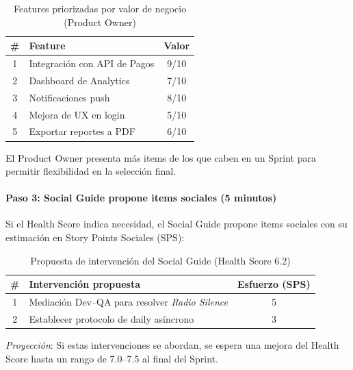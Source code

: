 \begin{table}[h]
    \centering
    \small
    \begin{tabularx}{\textwidth}{|c|X|c|}
        \hline
        \textbf{\#} & \textbf{Feature}             & \textbf{Valor} \\
        \hline
        1           & Integración con API de Pagos & 9/10           \\
        \hline
        2           & Dashboard de Analytics       & 7/10           \\
        \hline
        3           & Notificaciones push          & 8/10           \\
        \hline
        4           & Mejora de UX en login        & 5/10           \\
        \hline
        5           & Exportar reportes a PDF      & 6/10           \\
        \hline
    \end{tabularx}
    \caption{Features priorizadas por valor de negocio (Product Owner)}
    \label{tab:features-priorizadas-valor}
\end{table}
\FloatBarrier

El Product Owner presenta más items de los que caben en un Sprint para permitir flexibilidad en la selección final.

\paragraph{Paso 3: Social Guide propone items sociales (5 minutos)}

Si el Health Score indica necesidad, el Social Guide propone items sociales con su estimación en Story Points Sociales (SPS):

\begin{table}[h]
    \centering
    \small
    \begin{tabularx}{\textwidth}{|c|X|c|}
        \hline
        \textbf{\#} & \textbf{Intervención propuesta}                        & \textbf{Esfuerzo (SPS)} \\
        \hline
        1           & Mediación Dev--QA para resolver \textit{Radio Silence} & 5                       \\
        \hline
        2           & Establecer protocolo de daily asíncrono                & 3                       \\
        \hline
    \end{tabularx}
    \caption{Propuesta de intervención del Social Guide (Health Score 6.2)}
    \label{tab:propuesta-social-guide}
\end{table}
\FloatBarrier
\textit{Proyección}: Si estas intervenciones se abordan, se espera una mejora del Health Score hasta un rango de 7.0--7.5 al final del Sprint.


